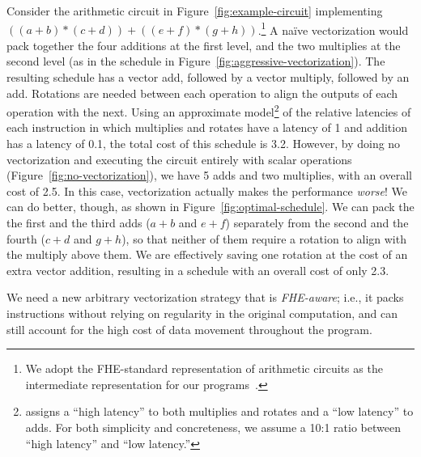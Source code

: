 %
Consider the arithmetic circuit in Figure~\ref{fig:example-circuit} implementing $((a + b) * (c + d)) + ((e + f) * (g + h))$.\footnote{We adopt the FHE-standard representation of arithmetic circuits as the intermediate representation for our programs~\cite{Gentry,CircuitRewriting,Ramparts,Porcupine}.}
A na\"ive vectorization would pack together the four additions at the first level, and the two multiplies at the second level (as in the schedule in Figure~\ref{fig:aggressive-vectorization}).
The resulting schedule has a vector add, followed by a vector multiply, followed by an add. Rotations are needed between each operation to align the outputs of each operation with the next.
Using an approximate model\footnote{\citet{AlgosHElib} assigns a ``high latency'' to both multiplies and rotates and a ``low latency'' to adds. For both simplicity and concreteness, we assume a 10:1 ratio between ``high latency'' and ``low latency.''} of the relative latencies of each instruction in which multiplies and rotates have a latency of 1 and addition has a latency of 0.1, the total cost of this schedule is 3.2.
However, by doing no vectorization and executing the circuit entirely with scalar operations (Figure~\ref{fig:no-vectorization}), we have 5 adds and two multiplies, with an overall cost of 2.5.
In this case, vectorization actually makes the performance {\em worse}!
We can do better, though, as shown in Figure~\ref{fig:optimal-schedule}.
We can pack the the first and the third adds ($a + b$ and $e + f$) separately from the second and the fourth ($c + d$ and $g + h$), so that neither of them require a rotation to align with the multiply above them.
We are effectively saving one rotation at the cost of an extra vector addition, resulting in a schedule with an overall cost of only 2.3.

We need a new arbitrary vectorization strategy that is {\em FHE-aware}; i.e., it packs instructions without relying on regularity in the original computation, and can still account for the high cost of data movement throughout the program.

